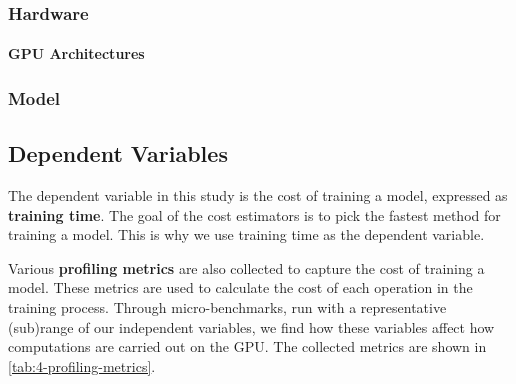 \subsubsection{Hardware}
\label{subsubsec:4-hardware}
\paragraph{GPU Architectures}

\subsubsection{Model}

\subsection{Dependent Variables}

The dependent variable in this study is the cost of training a model, expressed as \textbf{training time}. The goal of the cost estimators is to pick the fastest method for training a model. This is why we use training time as the dependent variable.

Various \textbf{profiling metrics} are also collected to capture the cost of training a model. These metrics are used to calculate the cost of each operation in the training process. Through micro-benchmarks, run with a representative (sub)range of our independent variables, we find how these variables affect how computations are carried out on the GPU. The collected metrics are shown in \autoref{tab:4-profiling-metrics}.



